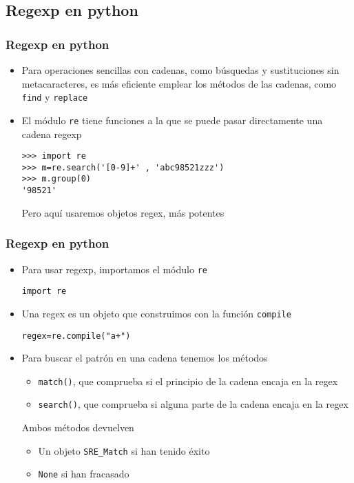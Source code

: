 \documentclass[ucs]{beamer}
\begin{document}
\subsection{Regexp en python}


\begin{frame}[fragile]
\frametitle{Regexp en python}
\begin{itemize}
\item
Para operaciones sencillas con cadenas, como búsquedas
y sustituciones sin metacaracteres, es más eficiente emplear
los métodos de las cadenas, como \verb|find| y \verb|replace|
\item
El módulo \verb|re| tiene funciones a la que se puede
pasar directamente una cadena regexp

  \begin{footnotesize}
  \begin{verbatim}
>>> import re
>>> m=re.search('[0-9]+' , 'abc98521zzz')
>>> m.group(0)
'98521'
  \end{verbatim}
  \end{footnotesize}

Pero aquí usaremos objetos regex, más potentes
\end{itemize}

\end{frame}



\begin{frame}[fragile]
\frametitle{Regexp en python}


\begin{itemize}
\item
Para usar regexp, importamos el módulo \verb|re|

\verb|import re|
\item
Una regex es un objeto que construimos con la función
\verb|compile| 

\verb|regex=re.compile("a+")|

\item

Para buscar el patrón en una cadena tenemos los métodos

\begin{itemize}
\item
\verb|match()|, que comprueba si el principio de la cadena encaja en la regex
\item
\verb|search()|, que comprueba si alguna parte de la cadena encaja en la regex
\end{itemize}

Ambos métodos devuelven

\begin{itemize}
\item
Un objeto \verb|SRE_Match| si han tenido éxito
\item
\verb|None| si han fracasado
\end{itemize}
\end{itemize}

\end{frame}
\end{document}

